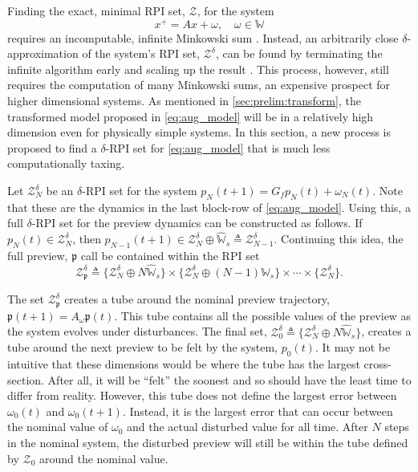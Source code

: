 Finding the exact, minimal RPI set, $\mathcal{Z}$, for the system
$$x^+=Ax+\omega,\quad \omega\in\mathbb{W}$$
requires an incomputable, infinite Minkowski sum \cite{Kolmanovsky1998}. Instead, an arbitrarily close $\delta$-approximation of the system's RPI set, $\mathcal{Z}^\delta$, can be found by terminating the infinite algorithm early and scaling up the result \cite{Rakovic2005}. This process, however, still requires the computation of many Minkowski sums, an expensive prospect for higher dimensional systems. As mentioned in \autoref{sec:prelim:transform}, the transformed model proposed in \eqref{eq:aug_model} will be in a relatively high dimension even for physically simple systems. In this section, a new process is proposed to find a  $\delta$-RPI set for \eqref{eq:aug_model} that is much less computationally taxing.

Let $\mathcal{Z}_N^\delta$ be an $\delta$-RPI set for the system $p_N(t+1)=G_fp_N(t)+\omega_N(t)$. Note that these are the dynamics in the last block-row of \eqref{eq:aug_model}. Using this, a full $\delta$-RPI set for the preview dynamics can be constructed as follows. If $p_N(t)\in\mathcal{Z}_N^\delta$, then $p_{N-1}(t+1)\in\mathcal{Z}_N^\delta\oplus \widehat{\mathbb{W}}_s \triangleq \mathcal{Z}_{N-1}^\delta$. Continuing this idea, the full preview, $\mathfrak{p}$ call be contained within the RPI set
$$\mathcal{Z}_{\mathfrak{p}}^\delta\triangleq \{\mathcal{Z}_N^\delta\oplus N\widehat{\mathbb{W}}_s\}\times\{\mathcal{Z}_N^\delta\oplus (N-1)\widehat{\mathbb{W}}_s\} \times \cdots\times \{\mathcal{Z}_N^\delta\}.$$

The set $\mathcal{Z}_{\mathfrak{p}}^\delta$ creates a tube around the nominal preview trajectory, $\mathfrak{p}(t+1)=A_\omega\mathfrak{p}(t)$. This tube contains all the possible values of the preview as the system evolves under disturbances. The final set, $\mathcal{Z}^\delta_{0}\triangleq\{\mathcal{Z}_{N}^\delta\oplus N\widehat{\mathbb{W}}_s\}$, creates a tube around the next preview to be felt by the system, $p_0(t)$. It may not be intuitive that these dimensions would be where the tube has the largest cross-section. After all, it will be ``felt'' the soonest and so should have the least time to differ from reality. However, this tube does not define the largest error between $\omega_0(t)$ and $\omega_0(t+1)$. Instead, it is the largest error that can occur between the nominal value of $\omega_0$ and the actual disturbed value for all time. After $N$ steps in the nominal system, the disturbed preview will still be within the tube defined by $\mathcal{Z}_0$ around the nominal value.


